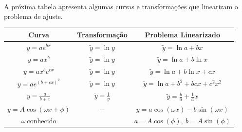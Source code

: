 A próxima tabela apresenta algumas curvas e transformações que linearizam o problema de ajuste.
\begin{center}
  \begin{tabular}{|c|c|c|}
Curva    & Transformação & Problema Linearizado\\ \hline
$\displaystyle y=ae^{bx}$       & $\tilde y=\ln y$   & $\tilde y=\ln a+ bx$\\ \hline
$\displaystyle y=ax^b $       &$\tilde y=\ln y$   & $\tilde y=\ln a+ b\ln x$\\ \hline
$\displaystyle y=ax^be^{cx}$    &$\tilde y=\ln y$  & $\tilde y=\ln a+ b\ln x+cx$\\ \hline
$\displaystyle y=ae^{(b+cx)^2}$ &$\tilde y=\ln y$       & $\tilde y=\ln a+b^2+ bc x+c^2x^2$\\ \hline
$\displaystyle y=\frac{a}{b+x}$ &$\displaystyle \tilde y=\frac{1}{y}$ & $\displaystyle \tilde y=\frac{b}{a}+\frac{1}{a}x$\\ \hline
$y=A\cos(\omega x+\phi)$   & $-$ &  $y=a\cos(\omega x)-b\sin(\omega x)$ \\
$\omega\ \text{conhecido} $&   &  $a=A\cos(\phi),\ b=A\sin(\phi)$ \\ \hline    
  \end{tabular}
\end{center}

